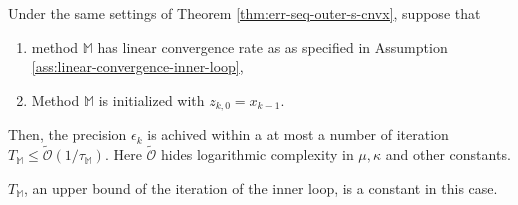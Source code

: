 \documentclass[12pt]{article}
\begin{document}
            \begin{proposition}\label{prop:inner-loop-complexity-s-cnvx}
                Under the same settings of Theorem \ref{thm:err-seq-outer-s-cnvx}, suppose that 
                \begin{enumerate}
                    \item method $\mathbb M$ has linear convergence rate as as specified in Assumption \ref{ass:linear-convergence-inner-loop}, 
                    \item Method $\mathbb M$ is initialized with  $z_{k, 0} = x_{k - 1}$. 
                \end{enumerate}
                Then, the precision $\epsilon_k$ is achived within a at most a number of iteration $T_{\mathbb M} \le \widetilde {\mathcal O}(1/ \tau_{\mathbb M})$. 
                Here $\widetilde{\mathcal O}$ hides logarithmic complexity in $\mu, \kappa$ and other constants. 
            \end{proposition}
            \begin{remark}
                $T_{\mathbb M}$, an upper bound of the iteration of the inner loop, is a constant in this case. 
            \end{remark}
\end{document}
